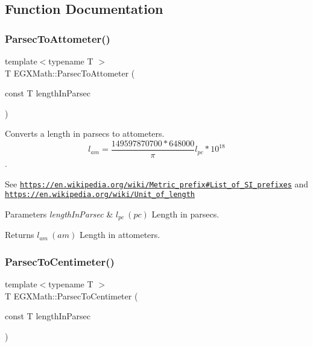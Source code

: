 \subsection{Function Documentation}
\mbox{\label{group___e_g_x_math-_conversions-_length_conversions-_astronomical-_parsec-_s_i_ga235c67c3c7b55d4ec553df3e1f435fbd}} 
\subsubsection{\texorpdfstring{Parsec\+To\+Attometer()}{ParsecToAttometer()}}
{\footnotesize\ttfamily template$<$typename T $>$ \\
T E\+G\+X\+Math\+::\+Parsec\+To\+Attometer (\begin{DoxyParamCaption}\item[{const T}]{length\+In\+Parsec }\end{DoxyParamCaption})}



Converts a length in parsecs to attometers. \[ l_{am}=\frac{149597870700 * 648000}{\pi}l_{pc} * 10^{18} \]. 

See \href{https://en.wikipedia.org/wiki/Metric_prefix#List_of_SI_prefixes}{\tt https\+://en.\+wikipedia.\+org/wiki/\+Metric\+\_\+prefix\#\+List\+\_\+of\+\_\+\+S\+I\+\_\+prefixes} and \href{https://en.wikipedia.org/wiki/Unit_of_length}{\tt https\+://en.\+wikipedia.\+org/wiki/\+Unit\+\_\+of\+\_\+length} 
\begin{DoxyParams}{Parameters}
{\em length\+In\+Parsec} & $ l_{pc}\ (pc)$ Length in parsecs. \\
\hline
\end{DoxyParams}
\begin{DoxyReturn}{Returns}
$ l_{am}\ (am)$ Length in attometers. 
\end{DoxyReturn}
\mbox{\label{group___e_g_x_math-_conversions-_length_conversions-_astronomical-_parsec-_s_i_ga87c7cdc557184f0451717a0bf04e9d38}} 
\subsubsection{\texorpdfstring{Parsec\+To\+Centimeter()}{ParsecToCentimeter()}}
{\footnotesize\ttfamily template$<$typename T $>$ \\
T E\+G\+X\+Math\+::\+Parsec\+To\+Centimeter (\begin{DoxyParamCaption}\item[{const T}]{length\+In\+Parsec }\end{DoxyParamCaption})}



